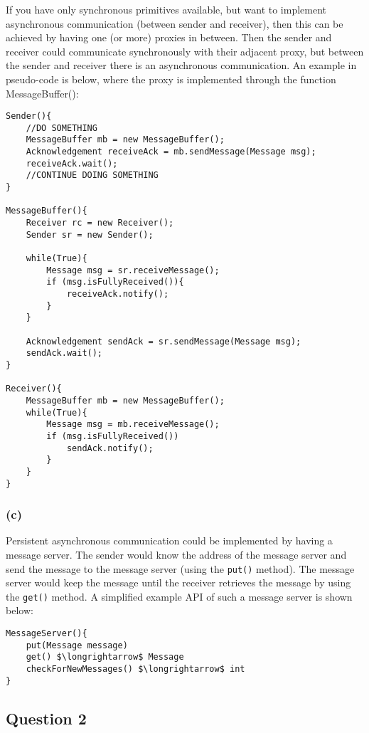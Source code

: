 \documentclass[12pt,a4paper,fleqn]{article}
\begin{document}
If you have only synchronous primitives available, but want to implement asynchronous communication (between sender and receiver), then this can be achieved by having one (or more) proxies in between. Then the sender and receiver could communicate synchronously with their adjacent proxy, but between the sender and receiver there is an asynchronous communication. An example in pseudo-code is below, where the proxy is implemented through the function MessageBuffer():

\begin{lstlisting}[basicstyle=\footnotesize,breaklines=true]
Sender(){
	//DO SOMETHING
	MessageBuffer mb = new MessageBuffer();
	Acknowledgement receiveAck = mb.sendMessage(Message msg);
	receiveAck.wait();
	//CONTINUE DOING SOMETHING
}

MessageBuffer(){
	Receiver rc = new Receiver();
	Sender sr = new Sender();
	
	while(True){
		Message msg = sr.receiveMessage();
		if (msg.isFullyReceived()){
			receiveAck.notify();
		}
	}
	
	Acknowledgement sendAck = sr.sendMessage(Message msg);
	sendAck.wait();
}

Receiver(){
	MessageBuffer mb = new MessageBuffer();
	while(True){
		Message msg = mb.receiveMessage();
		if (msg.isFullyReceived())
			sendAck.notify();
		}
	}
}
\end{lstlisting}

\subsubsection*{(c)}
Persistent asynchronous communication could be implemented by having a message server. The sender would know the address of the message server and send the message to the message server (using the \texttt{put()} method). The message server would keep the message until the receiver retrieves the message by using the \texttt{get()} method. A simplified example API of such a message server is shown below:

\begin{lstlisting}[basicstyle=\footnotesize,breaklines=true,mathescape]
MessageServer(){
    put(Message message)
    get() $\longrightarrow$ Message
    checkForNewMessages() $\longrightarrow$ int
}
\end{lstlisting}


\subsection*{Question 2}
\label{sec:eq2}
\end{document}

